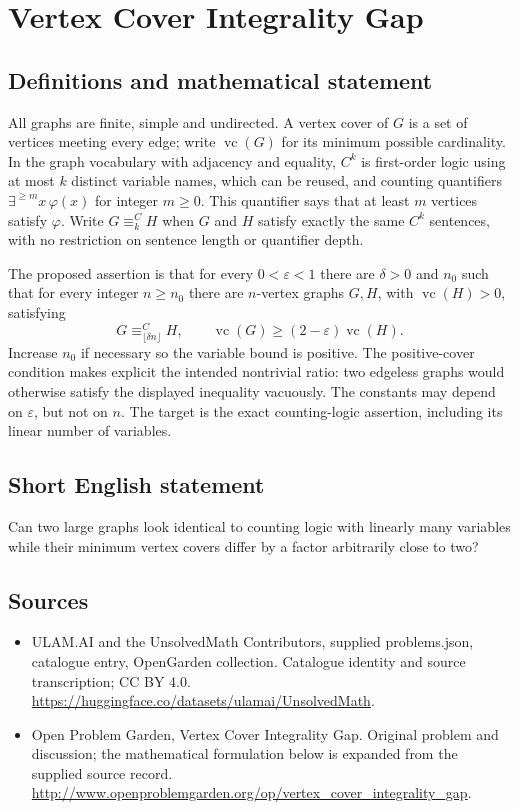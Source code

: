 \documentclass[11pt,a4paper]{article}
\begin{document}
\section*{Vertex Cover Integrality Gap}\label{statement}

\subsection{Definitions and mathematical statement}
All graphs are finite, simple and undirected. A vertex cover of $G$ is a
set of vertices meeting every edge; write $\operatorname{vc}(G)$ for its
minimum possible cardinality. In the graph vocabulary with adjacency and
equality, $C^k$ is first-order logic using at most $k$ distinct variable
names, which can be reused, and counting quantifiers
$\exists^{\ge m}x\,\varphi(x)$ for integer $m\ge0$. This quantifier says
that at least $m$ vertices satisfy $\varphi$. Write $G\equiv^C_k H$ when
$G$ and $H$ satisfy exactly the same $C^k$ sentences, with no restriction
on sentence length or quantifier depth.

The proposed assertion is that for every $0<\varepsilon<1$ there are
$\delta>0$ and $n_0$ such that for every integer $n\ge n_0$ there are
$n$-vertex graphs $G,H$, with $\operatorname{vc}(H)>0$, satisfying
\[
 G\equiv^C_{\lfloor\delta n\rfloor}H,
 \qquad \operatorname{vc}(G)\ge(2-\varepsilon)\operatorname{vc}(H).
\]
Increase $n_0$ if necessary so the variable bound is positive. The
positive-cover condition makes explicit the intended nontrivial ratio:
two edgeless graphs would otherwise satisfy the displayed inequality
vacuously. The constants may depend on $\varepsilon$, but not on $n$.
The target is the exact counting-logic assertion, including its linear
number of variables.
\subsection{Short English statement}
Can two large graphs look identical to counting logic with linearly many variables while their minimum vertex covers differ by a factor arbitrarily close to two?
\subsection{Sources}
\begin{itemize}
\item[S1] ULAM.AI and the UnsolvedMath Contributors, supplied problems.json, catalogue entry, OpenGarden collection. Catalogue identity and source transcription; CC BY 4.0.
\url{https://huggingface.co/datasets/ulamai/UnsolvedMath}.
\item[S2] Open Problem Garden, Vertex Cover Integrality Gap. Original problem and discussion; the mathematical formulation below is expanded from the supplied source record.
\url{http://www.openproblemgarden.org/op/vertex_cover_integrality_gap}.
\end{itemize}
\end{document}
